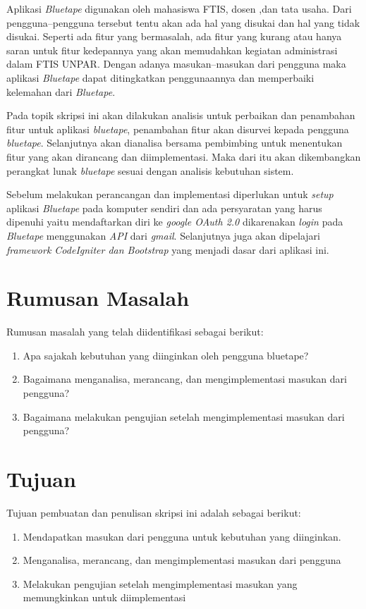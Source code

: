 Aplikasi \textit{Bluetape} digunakan oleh mahasiswa FTIS, dosen ,dan tata usaha. Dari pengguna--pengguna tersebut tentu akan ada hal yang disukai dan hal yang tidak disukai. Seperti ada fitur yang bermasalah, ada fitur yang kurang atau hanya saran untuk fitur kedepannya yang akan memudahkan kegiatan administrasi dalam FTIS UNPAR. Dengan adanya masukan--masukan dari pengguna maka aplikasi \textit{Bluetape} dapat ditingkatkan penggunaannya dan memperbaiki kelemahan dari \textit{Bluetape}.

Pada topik skripsi ini akan dilakukan analisis untuk perbaikan dan penambahan fitur untuk aplikasi \textit{bluetape}, penambahan fitur akan disurvei kepada pengguna \textit{bluetape}. Selanjutnya akan dianalisa bersama pembimbing untuk menentukan fitur yang akan dirancang dan diimplementasi. Maka dari itu akan dikembangkan perangkat lunak \textit{bluetape} sesuai dengan analisis kebutuhan sistem.


Sebelum melakukan perancangan dan implementasi diperlukan untuk \textit{setup} aplikasi \textit{Bluetape} pada komputer sendiri dan ada persyaratan yang harus dipenuhi yaitu mendaftarkan diri ke \textit{google OAuth 2.0} dikarenakan \textit{login} pada \textit{Bluetape} menggunakan \textit{API} dari \textit{gmail}. Selanjutnya juga akan dipelajari \textit{framework CodeIgniter dan Bootstrap} yang menjadi dasar dari aplikasi ini. 

\section{Rumusan Masalah}
\label{sec:rumusan}
Rumusan masalah yang telah diidentifikasi sebagai berikut:
\begin{enumerate}
	\item Apa sajakah kebutuhan yang diinginkan oleh pengguna bluetape?
	\item Bagaimana menganalisa, merancang, dan mengimplementasi masukan dari pengguna?
	\item Bagaimana melakukan pengujian setelah mengimplementasi masukan dari pengguna?

\end{enumerate}

\section{Tujuan}
\label{sec:tujuan}
Tujuan pembuatan dan penulisan skripsi ini adalah sebagai berikut:
\begin{enumerate}
	\item Mendapatkan masukan dari pengguna untuk kebutuhan yang diinginkan.
	\item Menganalisa, merancang, dan mengimplementasi masukan dari pengguna
	\item Melakukan pengujian setelah mengimplementasi masukan yang memungkinkan untuk diimplementasi

\end{enumerate}

